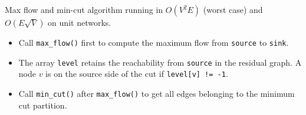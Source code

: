 
Max flow and min-cut algorithm running in $O(V^2 E)$ (worst case) and $O(E \sqrt{V})$ on unit networks.



\begin{itemize}
    \item Call \lstinline|max_flow()| first to compute the maximum flow from \lstinline|source| to \lstinline|sink|.
    \item The array \lstinline|level| retains the reachability from \lstinline|source| in the residual graph. A node $v$ is on the source side of the cut if \lstinline|level[v] != -1|.
    \item Call \lstinline|min_cut()| after \lstinline|max_flow()| to get all edges belonging to the minimum cut partition.
\end{itemize}
